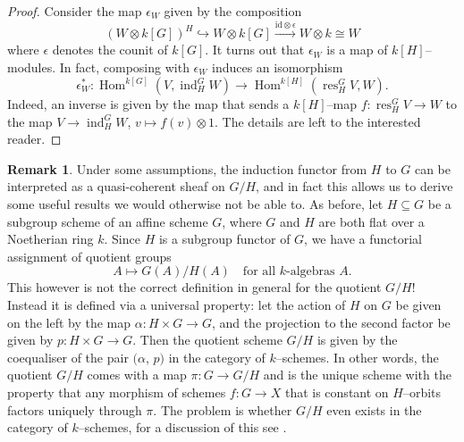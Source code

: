 \documentclass{article}
\theoremstyle{plain}
\theoremstyle{definition}
\newtheorem{Rem}[Th]{Remark}
\DeclareMathOperator{\Hom}{Hom}
\DeclareMathOperator{\ind}{ind}
\DeclareMathOperator{\res}{res}
\begin{document}
\begin{proof} 
   Consider the map $\epsilon_W$ given by the composition 
   \[
   (W\otimes k[G])^H\hookrightarrow W\otimes k[G] \xrightarrow{\mathrm{id}\otimes \epsilon} W\otimes k\cong W
   \]
   where $\epsilon$ denotes the counit of $k[G]$. It turns out that $\epsilon_W$ is a map of $k[H]$--modules. In fact,  composing with $\epsilon_W$ induces an isomorphism 
   \[
   \epsilon_W^\ast\colon  \Hom^{k[G]}(V, \ind^G_HW) \to \Hom^{k[H]}(\res_H^GV, W). 
   \]
   Indeed, an inverse is given by the map  that sends a $k[H]$--map $f\colon \res_H^G V \to W$  to the map $V\to \ind^G_H W$, $v\mapsto f(v)\otimes 1$. The details are left to the interested reader.   
\end{proof}




\begin{Rem}\label{flat subgroup scheme}
    Under some assumptions, the induction functor from $H$ to $G$ can be interpreted as a quasi-coherent sheaf on $G/H$, and in fact this allows us to derive some useful results we would otherwise not be able to. As before, let $H\subseteq G$ be a subgroup scheme of an affine scheme $G$, where $G$ and $H$ are both flat over a Noetherian ring $k$. Since $H$ is a subgroup functor of $G$, we have a functorial assignment of quotient groups 
    \[
    A\mapsto G(A)/H(A) \quad \textrm{for all }k\textrm{-algebras } A.
    \]
    This however is not the correct definition in general for the quotient $G/H$! Instead it is defined via a universal property: let the action of $H$ on $G$ be given on the left by the map $\alpha\colon  H\times G\to G$, and the projection to the second factor be given by $p\colon H\times G \to G$. Then the quotient scheme $G/H$ is given by the coequaliser of the pair $(\alpha$, $p)$ in the category of $k$--schemes. In other words, the quotient $G/H$ comes with a map $\pi\colon  G\to G/H$ and is the unique scheme with the property that any morphism of schemes $f\colon G\to X$ that is constant on $H$--orbits factors uniquely through $\pi$. The problem is whether $G/H$ even exists in the category of $k$--schemes, for a discussion of this see \cite[Chapter 5]{jantzen2003representations}. 
    

\end{Rem}
\end{document}
